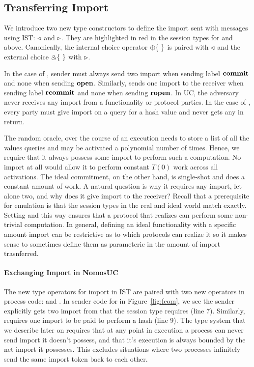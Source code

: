 \subsection{Transferring Import}
We introduce two new type constructors to define the import sent with messages using IST: $\triangleleft$ and $\triangleright$.
They are highlighted in red in the session types for \Fcom and \Fro above.
Canonically, the internal choice operator $\ichoice$ is paired with $\triangleleft$ and the external choice $\echoice$ with $\triangleright$.

In the case of \Fcom, sender must always send two import when sending label $\mathbf{commit}$ and none when sending $\mathbf{open}$.
Similarly, \Fcom sends one import to the receiver when sending label $\mathbf{rcommit}$ and none when sending $\mathbf{ropen}$.
In UC, the adversary never receives any import from a functionality or protocol parties. 
In the case of \Fro, every party must give import on a query for a hash value and never gets any in return.

The random oracle, over the course of an execution needs to store a list of all the values queries and may be activated a polynomial number of times.
Hence, we require that it always possess some import to perform such a computation. No import at all would allow it to perform constant $T(0)$ work across all activations.
The ideal commitment, on the other hand, is single-shot and does a constant amount of work. 
A natural question is why it requires any import, let alone two, and why does it give import to the receiver?
Recall that a prerequisite for emulation is that the session types in the real and ideal world match exactly. 
Setting  and  this way ensures that a protocol that realizes \Fcom can perform some non-trivial computation.
In general, defining an ideal functionality with a specific amount import can be restrictive as to which protocols can realize it so it makes sense to sometimes define them as parameteric in the amount of import trasnferred.

\paragraph{Exchanging Import in NomosUC}
The new type operators for import in IST are paired with two new operators in process code: \ipay and \iget.
In sender code for \protcom in Figure~\ref{fig:fcom}, we see the sender explicitly gets two import from \zp that the session type requires (line 7).
Similarly, \Fro requires one import to be paid to perform a hash (line 9).
The type system that we describe later on requires that at any point in execution a process can never send import it doesn't possess, and that it's execution is always bounded by the net import it possesses.
This excludes situations where two processes infinitely send the same import token back to each other.


